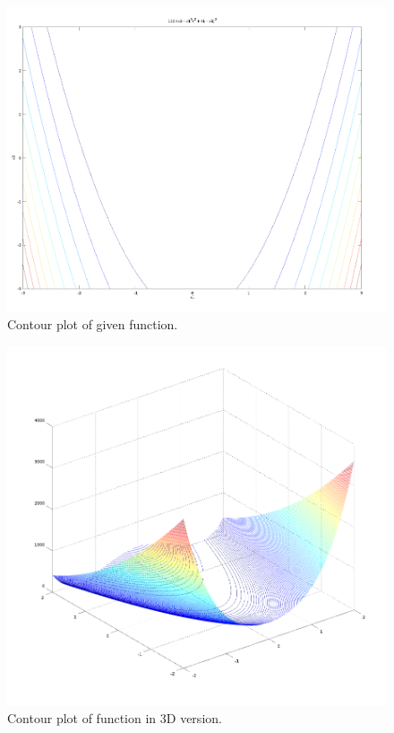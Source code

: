 \documentclass[eng,openany]{mgr}
\begin{document}
\begin{figure}[h]
\centering
\includegraphics[width=0.7\linewidth]{screenshot002}
\caption{Contour plot of given function.}
\label{fig:screenshot002}
\end{figure}
\newpage
\begin{figure}[h]
	\centering
	\includegraphics[width=0.7\linewidth]{screenshot007}
	\caption{Contour plot of function in 3D version.}
	\label{fig:screenshot007}
\end{figure}

\newpage
\end{document}
